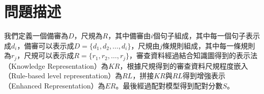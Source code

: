 
\chapter{問題描述}

我們定義一個備審為$D$，尺規為$R$，其中備審由$i$個句子組成，其中每一個句子表示成$d_i$，備審可以表示成$D=\{d_1,d_2,…,d_i\}$，尺規由$j$條規則組成，其中每一條規則為$r_j$，尺規可以表示成$R=\{r_1,r_2,…,r_j\}$，審查資料經過結合知識圖得到的表示法（Knowledge Representation）為$KR$，根據尺規得到的審查資料尺規程度嵌入（Rule-based level representation）為$RL$，拼接$KR$與$RL$得到增強表示（Enhanced Representation）為$ER$。最後經過配對模型得到配對分數$S$。